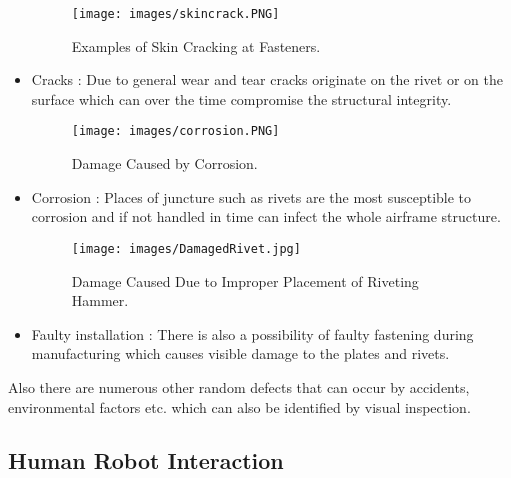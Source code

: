 \documentclass{article}
\begin{document}
    \begin{itemize}
    
    
        \begin{figure}[H]
        \centering
        \texttt{[image: images/skincrack.PNG]}
        \caption{Examples of Skin Cracking at Fasteners. \cite{FAA_visual_Inspection} }
         \label{fig: rivet/skin crack}
        \end{figure}
    
        \item Cracks : Due to general wear and tear cracks originate on the rivet or on the surface which can over the time compromise the structural integrity. \\ 
        
        \begin{figure}[H]
        \centering
        \texttt{[image: images/corrosion.PNG]}
        \caption{Damage Caused by Corrosion. \cite{FAA_visual_Inspection} }
         \label{fig:corrosion damage}
        \end{figure}
        
        \item Corrosion : Places of juncture such as rivets are the most susceptible to corrosion and if not handled in time can infect the whole airframe structure.
        
        
        \begin{figure}[H]
        \centering
        \texttt{[image: images/DamagedRivet.jpg]}
        \caption{Damage Caused Due to Improper Placement of Riveting Hammer. }
         \label{fig:damagedRivet}
        \end{figure}
        
        
        
        \item Faulty installation : There is also a possibility of faulty fastening during manufacturing which causes visible damage to the plates and rivets.
    \end{itemize}
    
    Also there are numerous other random defects that can occur by accidents, environmental factors etc. which can also be identified by visual inspection.
    
    

        
    
\quad \quad

\subsection{Human Robot Interaction}
\end{document}
